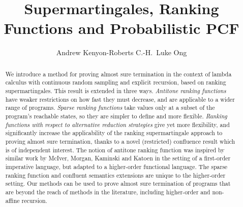 \documentclass{msc}
\theoremstyle{definition}
\begin{document}





\title{Supermartingales, Ranking Functions and Probabilistic PCF}

\begin{authgrp}
    \author{Andrew Kenyon-Roberts \qquad C.-H.~Luke Ong}
\end{authgrp}

\begin{abstract}
We introduce a method for proving almost sure termination in the context of lambda calculus with continuous random sampling and explicit recursion, based on ranking supermartingales. 
This result is extended in three ways. 
\emph{Antitone ranking functions} have weaker restrictions on how fast they must decrease, and are applicable to a wider range of programs. 
\emph{Sparse ranking functions} take values only at a subset of the program's reachable states, so they are simpler to define and more flexible. 
\emph{Ranking functions with respect to alternative reduction strategies} give yet more flexibility, and significantly increase the applicability of the ranking supermartingale approach to proving almost sure termination, thanks to a novel (restricted) confluence result which is of independent interest.
The notion of antitone ranking function was inspired by similar work by McIver, Morgan, Kaminski and Katoen in the setting of a first-order imperative language, but adapted to a higher-order functional language.
The sparse ranking function and confluent semantics extensions are unique to the higher-order setting.
Our methods can be used to prove almost sure termination of programs that are beyond the reach of methods in the literature, including higher-order and non-affine recursion.
\end{abstract}

\maketitle
\end{document}
